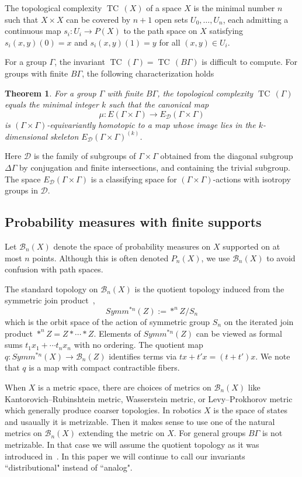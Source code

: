 \documentclass{amsart}
\numberwithin{equation}{section}
\theoremstyle{plain}
\newtheorem{thm}{Theorem}[subsection]
\theoremstyle{definition}
\def\TC{{\mathop\mathrm{TC}\,}}
\begin{document}
The topological complexity $\TC(X)$ of a space $X$ is the minimal number $n$ such that $X\times X$ can be covered by $n+1$ open sets $U_0,\dots, U_n$, each admitting a continuous map $s_i:U_i\to P(X)$ to the path space on $X$ satisfying  $s_i(x,y)(0)=x$ and $s_i(x,y)(1)=y$ for all $(x,y)\in U_i$.

For a group $\Gamma$, the invariant $\TC(\Gamma)=\TC(B\Gamma)$ is difficult to compute. For groups with finite $B\Gamma$, the following characterization holds~\cite{FGLO}
\begin{thm}\label{Farber}
For a group $\Gamma$ with finite $B\Gamma$, the topological complexity $\TC(\Gamma)$ equals the minimal integer $k$ such that the canonical map
$$\mu:E(\Gamma\times\Gamma)\to E_{\mathcal D}(\Gamma\times\Gamma)$$ is $(\Gamma\times\Gamma)$-equivariantly homotopic to a map whose image lies in
the $k$-dimensional skeleton $E_{\mathcal D}(\Gamma\times\Gamma)^{(k)}$.
\end{thm}
Here  $\mathcal D$ is the family of subgroups of $\Gamma\times\Gamma$ obtained from the diagonal  subgroup $\Delta\Gamma$  by conjugation and finite intersections, and containing the trivial subgroup. The space $E_{\mathcal D}(\Gamma\times\Gamma)$ is a classifying space for $(\Gamma\times\Gamma)$-actions with isotropy groups in $\mathcal D$.
\subsection{Probability measures with finite supports}
Let $\mathcal B_n(X)$ denote the space of probability measures on $X$ supported on at most $n$ points.
Although this is often denoted $P_n(X)$, we use $\mathcal B_n(X)$ to avoid confusion with path spaces.

The standard topology on $\mathcal B_n(X)$ is the quotient topology induced from the symmetric join product~\cite{KK},\cite{V}
 $$Symm^{\ast n}(Z):=\ast^nZ/S_n$$ which is the orbit space of the action of symmetric group $S_n$ on the iterated join product $\ast^nZ=Z\ast\cdots\ast Z$. 
 Elements of $Symm^{\ast n}(Z)$ can be viewed as formal sums $t_1x_1+\cdots t_nx_n$ with no ordering. 
 The quotient map $q:Symm^{\ast n}(X)\to \mathcal B_n(Z)$  identifies terms via $tx+t'x=(t+t')x$. We note that $q$ is a map with compact contractible fibers. 

When $X$ is a metric space, there are choices of metrics on $\mathcal B_n(X)$ like Kantorovich--Rubinshtein metric, Wasserstein metric, or
Levy--Prokhorov metric which generally produce coarser topologies. In robotics $X$ is the space of states and usaually it is metrizable. Then it makes sense to use
one of the natural metrics on $\mathcal B_n(X)$ extending the metric on $X$. For general groups $B\Gamma$ is not metrizable. In that case we will assume the quotient
topology as it was introduced in~\cite{KW1}. In this paper we will continue to call our invariants  ``distributional" instead of ``analog".
\end{document}
